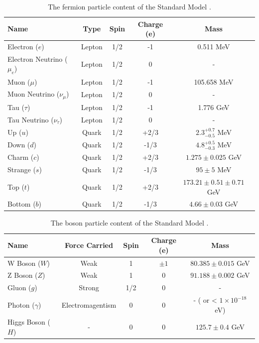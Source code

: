 \begin{table}[h!]
  \caption{The fermion particle content of the Standard Model \cite{Agashe:2014kda}.\label{tab:sm_fermions}}
  \centering
  \small
  \begin{tabular}{ lcccc }
    \hline
    \hline
    Name        & Type & Spin & Charge (e) & Mass \\
    \hline
    Electron ($e$)              & Lepton    & 1/2    & -1     & 0.511 MeV  \\
    Electron Neutrino ($\mu_{e}$)& Lepton   & 1/2    & 0      & -  \\
    Muon ($\mu$)                & Lepton    & 1/2    & -1     & 105.658 MeV  \\
    Muon Neutrino ($\nu_{\mu}$) & Lepton    & 1/2    & 0      & - \\
    Tau ($\tau$)                & Lepton    & 1/2    & -1     & 1.776 GeV  \\
    Tau Neutrino ($\nu_{\tau}$) & Lepton    & 1/2    & 0      & - \\
    Up ($u$)                    & Quark     & 1/2    & +2/3   & $2.3^{+0.7}_
    {-0.5}$ MeV \\
    Down ($d$)                  & Quark     & 1/2    & -1/3   & $4.8^{+0.5}_
    {-0.3}$ MeV \\
    Charm ($c$)                 & Quark     & 1/2    & +2/3   & $1.275 \pm
    0.025$ GeV \\
    Strange ($s$)               & Quark     & 1/2    & -1/3   & $95 \pm 5$ MeV\\
    Top ($t$)                   & Quark     & 1/2    & +2/3   & $173.21 \pm 0.51
    \pm 0.71$ GeV \\
    Bottom ($b$)                & Quark     & 1/2    & -1/3   & $4.66 \pm 0.03$
    GeV \\
    \hline
    \hline
  \end{tabular}
\end{table}

\begin{table}[h!]
  \caption{The boson particle content of the Standard Model \cite{Agashe:2014kda}.\label{tab:sm_bosons}}
  \centering
  \small
  \begin{tabular}{ lcccc }
    \hline
    \hline
    Name                            & Force Carried & Spin & Charge (e) & Mass \\
    \hline
    W Boson ($W$)     & Weak        & 1    & $\pm 1$  & $80.385 \pm 0.015$ GeV \\
    Z Boson ($Z$)     & Weak        & 1    & 0        & $91.188 \pm 0.002$ GeV \\
    Gluon ($g$)       & Strong      & 1/2  & 0        & - \\
    Photon ($\gamma$) & Electromagentism   & 0  & 0   & - ( or < $1\times10^
    {-18}$
    eV)\\
    Higgs Boson ($H$) & -           & 0    & 0        & $125.7 \pm 0.4$ GeV \\
    \hline
    \hline
  \end{tabular}
\end{table}


